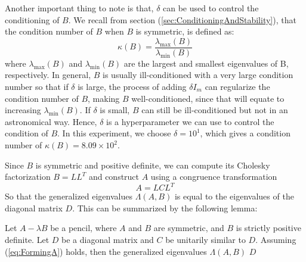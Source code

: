 Another important thing to note is that, $\delta$ can be used to control the conditioning of $B$. We recall from section (\ref{sec:ConditioningAndStability}), that the condition number of $B$ when $B$ is symmetric, is defined as:
\begin{equation}
	\kappa(B) = \frac{\lambda_{\max}(B)}{\lambda_{\min}(B)}
\end{equation}
where $\lambda_{\max}(B)$ and $\lambda_{\min}(B)$ are the largest and smallest eigenvalues of B, respectively.
In general, $B$ is usually ill-conditioned with a very large condition number so that if $\delta$ is large, the process of adding $\delta I_m$ can regularize the condition number of $B$, making $B$ well-conditioned, since that will equate to increasing $\lambda_{\min}(B)$. If $\delta$ is small, $B$ can still be ill-conditioned but not in an astronomical way. Hence, $\delta$ is a hyperparameter we can use to control the condition of $B$. In this experiment, we choose $\delta = 10^{1}$, which gives a condition number of $\kappa(B) = 8.09 \times 10^2$.

Since $B$ is symmetric and positive definite, we can compute its Cholesky factorization $B = LL^T$ and construct $A$ using a congruence transformation
\begin{equation}\label{eq:FormingA}
	A = LCL^T
\end{equation}
So that the generalized eigenvalues $\Lambda(A, B)$ is equal to the eigenvalues of the diagonal matrix $D$. This can be summarized by the following lemma:
\begin{lemma}
  Let $A-\lambda B$ be a pencil, where $A$ and $B$ are symmetric, and $B$ is strictly positive definite. Let $D$ be a diagonal matrix and $C$ be unitarily similar to $D$. Assuming (\ref{eq:FormingA}) holds, then the  generalized eigenvalues  $\Lambda(A, B)$  $D$
\end{lemma}

